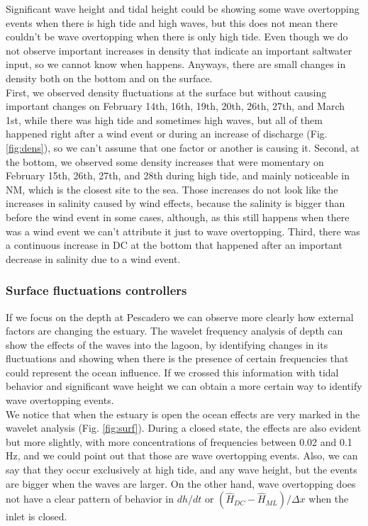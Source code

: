 \documentclass[tesis.tex]{subfiles}
\begin{document}
Significant wave height and tidal height could be showing some wave overtopping events when there is high tide and high waves, but this does not mean there couldn't be wave overtopping when there is only high tide. Even though we do not observe important increases in density that indicate an important saltwater input, so we cannot know when happens. Anyways, there are small changes in density both on the bottom and on the surface.\\

First, we observed density fluctuations at the surface but without causing important changes on February 14th, 16th, 19th, 20th, 26th, 27th, and March 1st, while there was high tide and sometimes high waves, but all of them happened right after a wind event or during an increase of discharge (Fig. \ref{fig:dens}), so we can't assume that one factor or another is causing it. Second, at the bottom, we observed some density increases that were momentary on February 15th, 26th, 27th, and 28th during high tide, and mainly noticeable in NM, which is the closest site to the sea. Those increases do not look like the increases in salinity caused by wind effects, because the salinity is bigger than before the wind event in some cases, although, as this still happens when there was a wind event we can't attribute it just to wave overtopping. Third, there was a continuous increase in DC at the bottom that happened after an important decrease in salinity due to a wind event.\\

\subsubsection{Surface fluctuations controllers}

If we focus on the depth at Pescadero we can observe more clearly how external factors are changing the estuary. The wavelet frequency analysis of depth can show the effects of the waves into the lagoon, by identifying changes in its fluctuations and showing when there is the presence of certain frequencies that could represent the ocean influence. If we crossed this information with tidal behavior and significant wave height we can obtain a more certain way to identify wave overtopping events. \\

We notice that when the estuary is open the ocean effects are very marked in the wavelet analysis (Fig. \ref{fig:surf}). During a closed state, the effects are also evident but more slightly, with more concentrations of frequencies between 0.02 and 0.1 Hz, and we could point out that those are wave overtopping events. Also, we can say that they occur exclusively at high tide, and any wave height, but the events are bigger when the waves are larger. On the other hand, wave overtopping does not have a clear pattern of behavior in $dh/dt$ or $(\hat{H}_{DC}-\hat{H}_{ML})/\Delta x$ when the inlet is closed.\\
\end{document}
